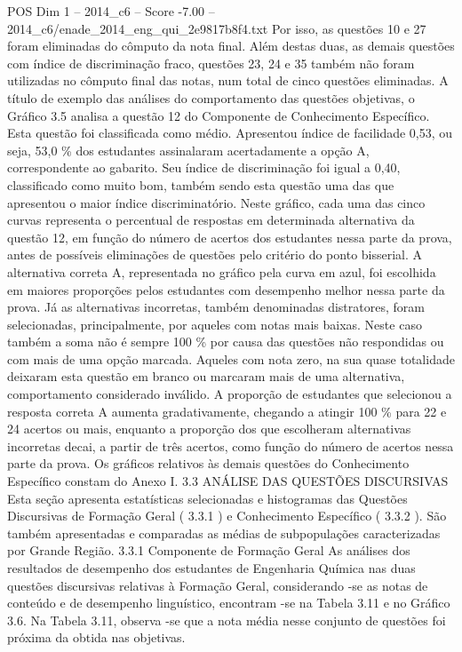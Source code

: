 \begin{textsample}{POS Dim 1 – 2014\_c6 – Score -7.00 – 2014\_c6/enade\_2014\_eng\_qui\_2e9817b8f4.txt}
Por isso, as questões 10 e 27 foram eliminadas do cômputo da nota final.
Além destas duas, as demais questões com índice de discriminação fraco, questões 23, 24 e 35 também não foram utilizadas no cômputo final das notas, num total de cinco questões eliminadas.
A título de exemplo das análises do comportamento das questões objetivas, o Gráfico 3.5 analisa a questão 12 do Componente de Conhecimento Específico.
Esta questão foi classificada como médio.
Apresentou índice de facilidade 0,53, ou seja, 53,0 \% dos estudantes assinalaram acertadamente a opção A, correspondente ao gabarito.
Seu índice de discriminação foi igual a 0,40, classificado como muito bom, também sendo esta questão uma das que apresentou o maior índice discriminatório.
Neste gráfico, cada uma das cinco curvas representa o percentual de respostas em determinada alternativa da questão 12, em função do número de acertos dos estudantes nessa parte da prova, antes de possíveis eliminações de questões pelo critério do ponto bisserial.
A alternativa correta A, representada no gráfico pela curva em azul, foi escolhida em maiores proporções pelos estudantes com desempenho melhor nessa parte da prova.
Já as alternativas incorretas, também denominadas distratores, foram selecionadas, principalmente, por aqueles com notas mais baixas.
Neste caso também a soma não é sempre 100 \% por causa das questões não respondidas ou com mais de uma opção marcada.
Aqueles com nota zero, na sua quase totalidade deixaram esta questão em branco ou marcaram mais de uma alternativa, comportamento considerado inválido.
A proporção de estudantes que selecionou a resposta correta A aumenta gradativamente, chegando a atingir 100 \% para 22 e 24 acertos ou mais, enquanto a proporção dos que escolheram alternativas incorretas decai, a partir de três acertos, como função do número de acertos nessa parte da prova.
Os gráficos relativos às demais questões do Conhecimento Específico constam do Anexo I. 3.3 ANÁLISE DAS QUESTÕES DISCURSIVAS Esta seção apresenta estatísticas selecionadas e histogramas das Questões Discursivas de Formação Geral ( 3.3.1 ) e Conhecimento Específico ( 3.3.2 ).
São também apresentadas e comparadas as médias de subpopulações caracterizadas por Grande Região. 3.3.1 Componente de Formação Geral As análises dos resultados de desempenho dos estudantes de Engenharia Química nas duas questões discursivas relativas à Formação Geral, considerando -se as notas de conteúdo e de desempenho linguístico, encontram -se na Tabela 3.11 e no Gráfico 3.6.
Na Tabela 3.11, observa -se que a nota média nesse conjunto de questões foi próxima da obtida nas objetivas.

\end{textsample}
